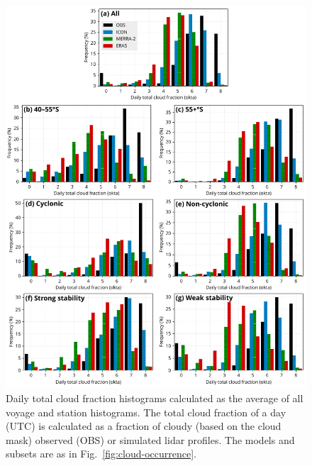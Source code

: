 \documentclass[draft]{agujournal2019}
\begin{document}
\begin{figure}[p!]
\centering
\includegraphics[width=\textwidth]{img/clt_hist.pdf}
\caption{
Daily total cloud fraction histograms calculated as the average of all voyage and station histograms. The total cloud fraction of a day (UTC) is calculated as a fraction of cloudy (based on the cloud mask) observed (OBS) or simulated lidar profiles. The models and subsets are as in Fig.~\ref{fig:cloud-occurrence}.
}
\label{fig:cloud-cover}
\end{figure}
\end{document}
